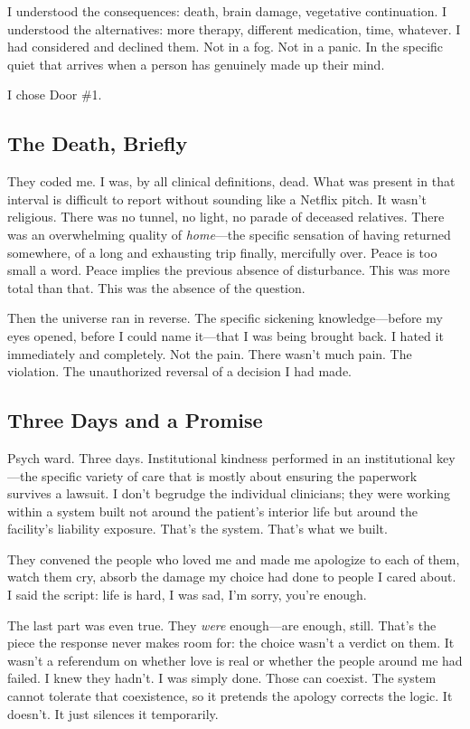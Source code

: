 \documentclass[10pt, letterpaper, twocolumn]{article}
\begin{document}
I understood the consequences: death, brain damage, vegetative continuation. I understood the alternatives: more therapy, different medication, time, whatever. I had considered and declined them. Not in a fog. Not in a panic. In the specific quiet that arrives when a person has genuinely made up their mind.

I chose Door \#1.

\subsection{The Death, Briefly}

They coded me. I was, by all clinical definitions, dead. What was present in that interval is difficult to report without sounding like a Netflix pitch. It wasn't religious. There was no tunnel, no light, no parade of deceased relatives. There was an overwhelming quality of \textit{home}---the specific sensation of having returned somewhere, of a long and exhausting trip finally, mercifully over. Peace is too small a word. Peace implies the previous absence of disturbance. This was more total than that. This was the absence of the question.

Then the universe ran in reverse. The specific sickening knowledge---before my eyes opened, before I could name it---that I was being brought back. I hated it immediately and completely. Not the pain. There wasn't much pain. The violation. The unauthorized reversal of a decision I had made.

\subsection{Three Days and a Promise}

Psych ward. Three days. Institutional kindness performed in an institutional key---the specific variety of care that is mostly about ensuring the paperwork survives a lawsuit. I don't begrudge the individual clinicians; they were working within a system built not around the patient's interior life but around the facility's liability exposure. That's the system. That's what we built.

They convened the people who loved me and made me apologize to each of them, watch them cry, absorb the damage my choice had done to people I cared about. I said the script: life is hard, I was sad, I'm sorry, you're enough.

The last part was even true. They \textit{were} enough---are enough, still. That's the piece the response never makes room for: the choice wasn't a verdict on them. It wasn't a referendum on whether love is real or whether the people around me had failed. I knew they hadn't. I was simply done. Those can coexist. The system cannot tolerate that coexistence, so it pretends the apology corrects the logic. It doesn't. It just silences it temporarily.
\end{document}
